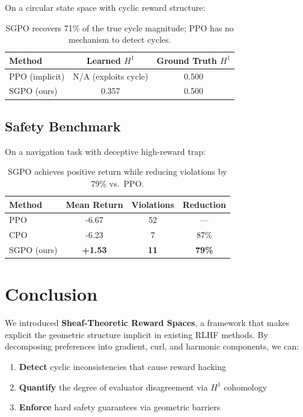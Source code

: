 \documentclass{article}
\begin{document}
On a circular state space with cyclic reward structure:
\begin{table}[H]
    \centering
    \begin{tabular}{lcc}
        \toprule
        \textbf{Method} & \textbf{Learned $H^1$} & \textbf{Ground Truth $H^1$} \\
        \midrule
        PPO (implicit) & N/A (exploits cycle) & 0.500 \\
        SGPO (ours) & 0.357 & 0.500 \\
        \bottomrule
    \end{tabular}
    \caption{SGPO recovers 71\% of the true cycle magnitude; PPO has no mechanism to detect cycles.}
\end{table}

\subsection{Safety Benchmark}

On a navigation task with deceptive high-reward trap:
\begin{table}[H]
    \centering
    \begin{tabular}{lccc}
        \toprule
        \textbf{Method} & \textbf{Mean Return} & \textbf{Violations} & \textbf{Reduction} \\
        \midrule
        PPO & -6.67 & 52 & --- \\
        CPO & -6.23 & 7 & 87\% \\
        SGPO (ours) & \textbf{+1.53} & \textbf{11} & \textbf{79\%} \\
        \bottomrule
    \end{tabular}
    \caption{SGPO achieves positive return while reducing violations by 79\% vs.\ PPO.}
\end{table}

\section{Conclusion}

We introduced \textbf{Sheaf-Theoretic Reward Spaces}, a framework that makes explicit the geometric structure implicit in existing RLHF methods. By decomposing preferences into gradient, curl, and harmonic components, we can:
\begin{enumerate}[leftmargin=*]
    \item \textbf{Detect} cyclic inconsistencies that cause reward hacking
    \item \textbf{Quantify} the degree of evaluator disagreement via $H^1$ cohomology
    \item \textbf{Enforce} hard safety guarantees via geometric barriers
\end{enumerate}
\end{document}
